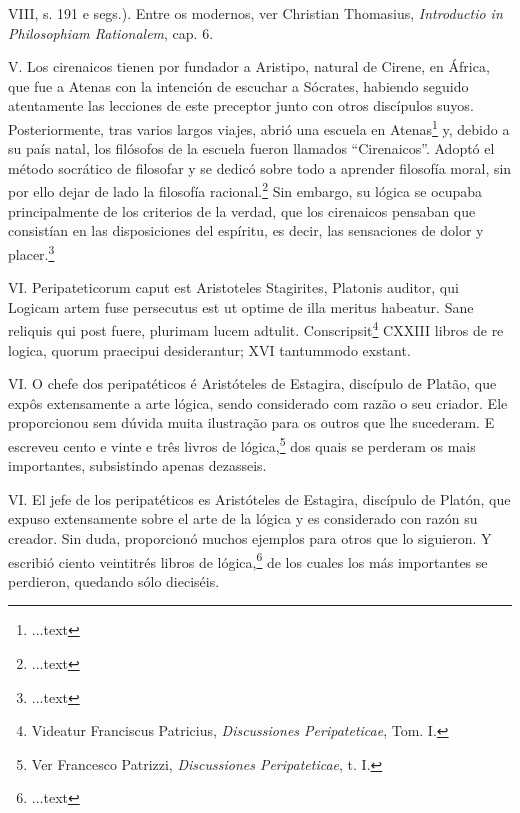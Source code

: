 \documentclass{article}
\begin{document}
\begin{paracol}{3}
\begin{nthcolumn}{1}
{    VIII, s. 191 e segs.). Entre os modernos, ver Christian Thomasius, \emph{Introductio in Philosophiam Rationalem}, cap. 6.}
  \end{nthcolumn}
  \vspace{0.5cm}
  \begin{nthcolumn}{2} %
    V. Los cirenaicos tienen por fundador a Aristipo, natural de Cirene, en África, que fue a Atenas con la intención de escuchar a Sócrates, habiendo seguido atentamente las lecciones de este preceptor junto con otros discípulos suyos. Posteriormente, tras varios largos viajes, abrió una escuela en Atenas\footnote[26]{...text} y, debido a su país natal, los filósofos de la escuela fueron llamados “Cirenaicos”. Adoptó el método socrático de filosofar y se dedicó sobre todo a aprender filosofía moral, sin por ello dejar de lado la filosofía racional.\footnote[27]{...text} Sin embargo, su lógica se ocupaba principalmente de los criterios de la verdad, que los cirenaicos pensaban que consistían en las disposiciones del espíritu, es decir, las sensaciones de dolor y placer.\footnote[28]{...text}
  \end{nthcolumn}
  \vspace{0.5cm}
  \begin{nthcolumn*}{0} %
    VI. Peripateticorum caput est Aristoteles Stagirites, Platonis auditor, qui Logicam artem fuse persecutus est ut optime de illa meritus habeatur. Sane reliquis qui post fuere, plurimam lucem adtulit. Conscripsit\footnote[29]{Videatur Franciscus Patricius, \emph{Discussiones Peripateticae}, Tom. I.} CXXIII libros de re logica, quorum praecipui desiderantur; XVI tantummodo exstant.
  \end{nthcolumn*}
  \vspace{0.5cm}
  \begin{nthcolumn}{1} %
    VI. O chefe dos peripatéticos é Aristóteles de Estagira, discípulo de Platão, que expôs extensamente a arte lógica, sendo considerado com razão o seu criador. Ele proporcionou sem dúvida muita ilustração para os outros que lhe sucederam. E escreveu cento e vinte e três livros de lógica,\footnote[29]{Ver Francesco Patrizzi, \emph{Discussiones Peripateticae}, t. I.} dos quais se perderam os mais importantes, subsistindo apenas dezasseis.
  \end{nthcolumn}
  \vspace{0.5cm}
  \begin{nthcolumn}{2} %
    VI. El jefe de los peripatéticos es Aristóteles de Estagira, discípulo de Platón, que expuso extensamente sobre el arte de la lógica y es considerado con razón su creador. Sin duda, proporcionó muchos ejemplos para otros que lo siguieron. Y escribió ciento veintitrés libros de lógica,\footnote[29]{...text} de los cuales los más importantes se perdieron, quedando sólo dieciséis.

\end{nthcolumn}
\end{paracol}
\end{document}
